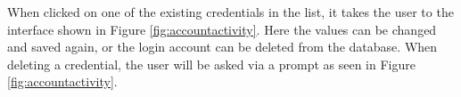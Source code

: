 When clicked on one of the existing credentials in the list, it takes the user to the interface shown in Figure \ref{fig:accountactivity}\protect{}.  Here the values can be changed and saved again, or the login account can be deleted from the database. When deleting a credential, the user will be asked via a prompt as seen in Figure \ref{fig:accountactivity}\protect{}.

\begin{figure}[H]
\centering
{}
\qquad
{}
\qquad
{}

\end{figure}
